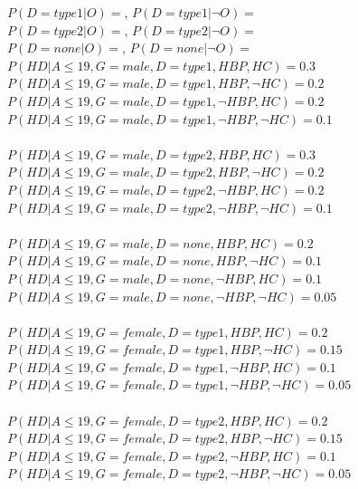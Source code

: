 \documentclass{article}
\begin{document}
$P(D = type1 | O) = $, $P(D = type1 | \neg O) = $\\
$P(D = type2 | O) = $, $P(D = type2 | \neg O) = $\\
$P(D = none | O) = $, $P(D = none | \neg O) = $\\

$P(HD | A \leq 19, G = male, D = type1, HBP, HC) = 0.3 $\\
$P(HD | A \leq 19, G = male, D = type1, HBP, \neg HC) = 0.2$\\
$P(HD | A \leq 19, G = male, D = type1, \neg HBP, HC) = 0.2$\\
$P(HD | A \leq 19, G = male, D = type1, \neg HBP, \neg HC) = 0.1$\\
\\
$P(HD | A \leq 19, G = male, D = type2, HBP, HC) = 0.3 $\\
$P(HD | A \leq 19, G = male, D = type2, HBP, \neg HC) = 0.2$\\
$P(HD | A \leq 19, G = male, D = type2, \neg HBP, HC) = 0.2$\\
$P(HD | A \leq 19, G = male, D = type2, \neg HBP, \neg HC) = 0.1$\\
\\
$P(HD | A \leq 19, G = male, D = none, HBP, HC) = 0.2 $\\
$P(HD | A \leq 19, G = male, D = none, HBP, \neg HC) = 0.1$\\
$P(HD | A \leq 19, G = male, D = none, \neg HBP, HC) = 0.1$\\
$P(HD | A \leq 19, G = male, D = none, \neg HBP, \neg HC) = 0.05$\\
\\
$P(HD | A \leq 19, G = female, D = type1, HBP, HC) = 0.2 $\\
$P(HD | A \leq 19, G = female, D = type1, HBP, \neg HC) = 0.15$\\
$P(HD | A \leq 19, G = female, D = type1, \neg HBP, HC) = 0.1$\\
$P(HD | A \leq 19, G = female, D = type1, \neg HBP, \neg HC) = 0.05$\\
\\
$P(HD | A \leq 19, G = female, D = type2, HBP, HC) = 0.2 $\\
$P(HD | A \leq 19, G = female, D = type2, HBP, \neg HC) = 0.15$\\
$P(HD | A \leq 19, G = female, D = type2, \neg HBP, HC) = 0.1$\\
$P(HD | A \leq 19, G = female, D = type2, \neg HBP, \neg HC) = 0.05$\\
\\
\end{document}
